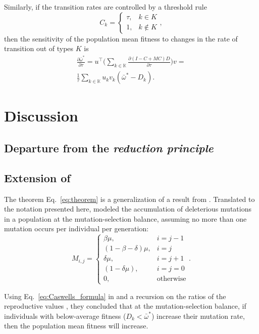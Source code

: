 \documentclass[a4paper,twocolumn]{article}   	%
\newcommand*{\tr}{^\intercal}
\begin{document}
Similarly, if the transition rates are controlled by a threshold rule 
$$
C_k = \begin{cases}
\tau, & k \in K \\
1, & k \not\in K
\end{cases},
$$
then the sensitivity of the population mean fitness to changes in the
rate of transition out of types $K$ is
\begin{equation*}
\begin{aligned}
\frac{\partial \bar{\omega}^*}{\partial \tau} = 
u\tr \Big( \sum_{k \in \mathbb{K{}}}{\frac{\partial (I - C + MC)D}{\partial \tau}} \Big) v = \\
\frac{1}{\tau} \sum_{k \in \mathbb{K}}{u_k v_k (\bar{\omega}^* - D_k)}.
\end{aligned}
\end{equation*}

\section*{Discussion}
\subsection*{Departure from the \emph{reduction principle}}

\subsection*{Extension of \citealt{Ram2012}}

The theorem Eq.~\ref{eq:theorem} is a generalization of a result from \citet[Eq.~4]{Ram2012}.
Translated to the notation presented here, \citeauthor{Ram2012} modeled the accumulation of deleterious mutations in a population at the mutation-selection balance, assuming no more than one mutation occurs per individual per generation: 
$$
M_{i,j} = \begin{cases}
\beta \mu, & i = j-1 \\
(1-\beta-\delta) \mu, & i = j \\
\delta \mu, & i = j+1 \\
(1-\delta \mu), & i=j=0 \\
0, & \text{otherwise}
\end{cases}.
$$

Using Eq.~\ref{eq:Caswells_formula} in  and a recursion on the ratios of the reproductive values \cite[see][eqs.~A5-6]{Ram2012}, they concluded
that at the mutation-selection balance, if individuals with below-average fitness ($D_k < \bar{\omega}^*$) increase their mutation rate, then the population mean fitness will increase.
\end{document}
